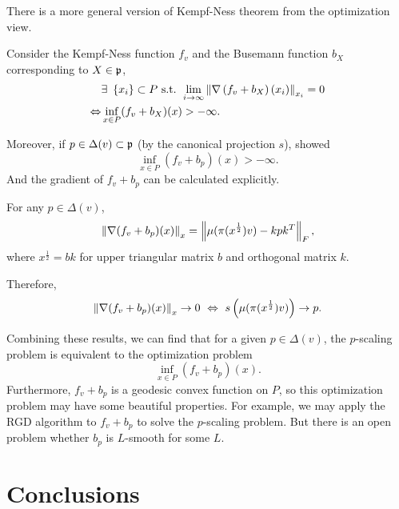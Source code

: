 \documentclass[suri,pdfbookmark]{engsuribt} %
\begin{document}
  There is a more general version of Kempf-Ness theorem from the optimization view.
  \begin{thm}
    Consider the Kempf-Ness function $f_v$ and the Busemann function $b_X$ corresponding to $X \in \mathfrak{p}$,
    \begin{equation*}
      \begin{split}
        ~&\exists~\left\{x_i\right\} \subset P \text{ s.t. }\lim_{i \rightarrow \infty}\left\lVert\nabla \left(f_v+b_X\right)(x_i)\right\lVert_{x_i} = 0 \\
        \Leftrightarrow& \inf_{x \in P} (f_v + b_X)(x) > -\infty.
      \end{split}
    \end{equation*}
  \end{thm}

  Moreover, if $p \in \Delta(v) \subset \mathfrak{p}$ (by the canonical projection $s$), \cite[Section 3.2]{key12} showed
  \begin{equation*}
    \inf_{x \in P} (f_v + b_p)(x) > -\infty.
  \end{equation*}
  And the gradient of $f_v+b_p$ can be calculated explicitly.
  \begin{prop}
    For any $p \in \Delta(v)$, 
    \begin{equation*}
      \left\lVert\nabla(f_v+b_p)(x)\right\lVert_{x} = \left\lVert\mu(\pi(x^{\frac{1}{2}})v)-kpk^T\right\lVert_{F},
    \end{equation*}
    where $x^{\frac{1}{2}} = bk$ for upper triangular matrix $b$ and orthogonal matrix $k$.
  \end{prop}
  Therefore,
  \begin{equation*}
    \left\lVert\nabla(f_v+b_p)(x)\right\lVert_{x} \rightarrow 0 ~\Leftrightarrow~ s\left(\mu(\pi(x^{\frac{1}{2}})v)\right) \rightarrow p.
  \end{equation*}

  Combining these results, we can find that for a given $p \in \Delta(v)$, the $p$-scaling problem is equivalent to the optimization problem
  \begin{equation*}
    \inf_{x \in P} (f_v + b_p)(x).
  \end{equation*}
  Furthermore, $f_v + b_p$ is a geodesic convex function on $P$, so this optimization problem may have some beautiful properties. For example, we may apply the RGD algorithm to $f_v + b_p$ to solve the $p$-scaling problem. But there is an open problem whether $b_p$ is $L$-smooth for some $L$. 


  \chapter{Conclusions}
\end{document}
